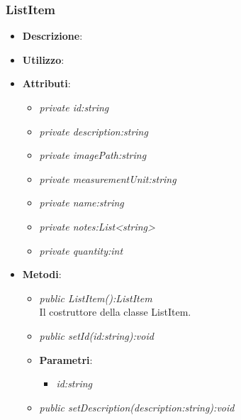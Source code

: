 \subsubsection{ListItem}
\begin{itemize}
\item \textbf{Descrizione}:
\item \textbf{Utilizzo}:
\item \textbf{Attributi}: 
	\begin{itemize}
	\item \textit{private id:string}\\
	
	\item \textit{private description:string}\\
	
	\item \textit{private imagePath:string}\\
	
	\item \textit{private measurementUnit:string}\\
	
	\item \textit{private name:string}\\
	
	\item \textit{private notes:List<string>}\\
	
	\item \textit{private quantity:int}\\
	
	\end{itemize}
\item \textbf{Metodi}:
	\begin{itemize}
	\item \textit{public ListItem():ListItem}\\
	Il costruttore della classe ListItem.
	\item \textit{public setId(id:string):void}\\
	
				\item{\textbf{Parametri}: \begin{itemize}
				\item \textit{id:string}\\

			\end{itemize}}
	\item \textit{public setDescription(description:string):void}\\
	

\end{itemize}
\end{itemize}
